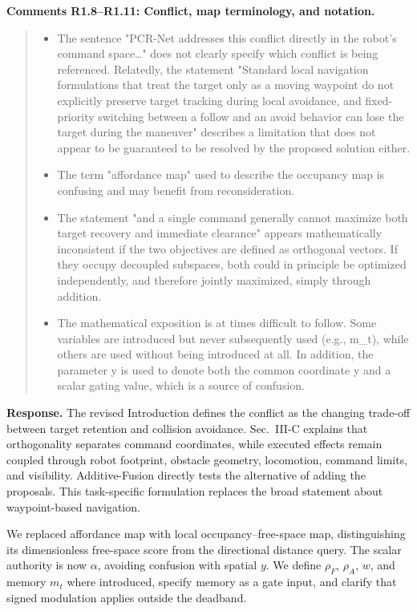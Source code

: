 \documentclass[letterpaper,11pt]{article}
\begin{document}
\noindent\textbf{Comments R1.8--R1.11: Conflict, map terminology, and notation.}
\begin{quote}\color{reviewgray}
\begin{itemize}[leftmargin=*,nosep,label={}]
\item[\textbf{R1.8.}] The sentence "PCR-Net addresses this conflict directly in the robot's command space…" does not clearly specify which conflict is being referenced. Relatedly, the statement "Standard local navigation formulations that treat the target only as a moving waypoint do not explicitly preserve target tracking during local avoidance, and fixed-priority switching between a follow and an avoid behavior can lose the target during the maneuver" describes a limitation that does not appear to be guaranteed to be resolved by the proposed solution either.
\item[\textbf{R1.9.}] The term "affordance map" used to describe the occupancy map is confusing and may benefit from reconsideration.
\item[\textbf{R1.10.}] The statement "and a single command generally cannot maximize both target recovery and immediate clearance" appears mathematically inconsistent if the two objectives are defined as orthogonal vectors. If they occupy decoupled subspaces, both could in principle be optimized independently, and therefore jointly maximized, simply through addition.
\item[\textbf{R1.11.}] The mathematical exposition is at times difficult to follow. Some variables are introduced but never subsequently used (e.g., m\_t), while others are used without being introduced at all. In addition, the parameter y is used to denote both the common coordinate y and a scalar gating value, which is a source of confusion.
\end{itemize}
\end{quote}
\noindent\textbf{Response.}
The revised Introduction defines the conflict as the changing trade-off between target retention and collision avoidance. Sec.~III-C explains that orthogonality separates command coordinates, while executed effects remain coupled through robot footprint, obstacle geometry, locomotion, command limits, and visibility. Additive-Fusion directly tests the alternative of adding the proposals. This task-specific formulation replaces the broad statement about waypoint-based navigation.

We replaced affordance map with local occupancy--free-space map, distinguishing its dimensionless free-space score from the directional distance query. The scalar authority is now $\alpha$, avoiding confusion with spatial $y$. We define $\rho_F$, $\rho_A$, $w$, and memory $m_t$ where introduced, specify memory as a gate input, and clarify that signed modulation applies outside the deadband.
\par\nopagebreak[4]
\end{document}

